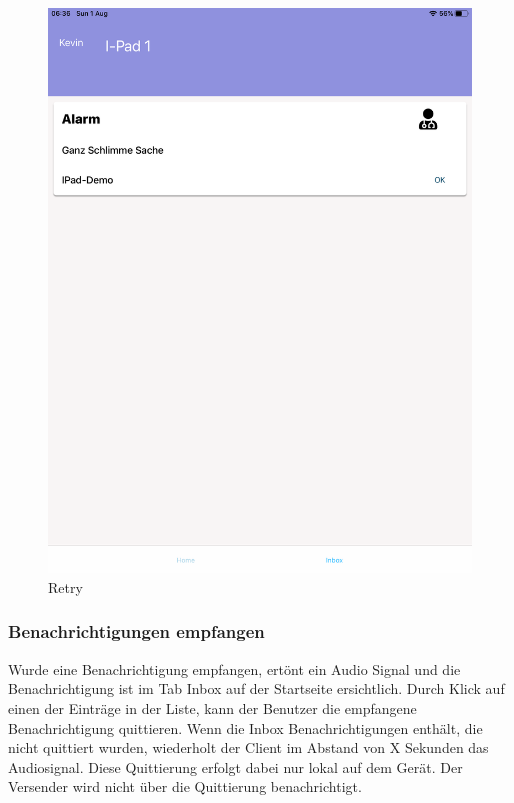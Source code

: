 \begin{figure}[h]
\begin{minipage}[b]{0.4\textwidth}
        \includegraphics[width=\textwidth]{graphics/screenshots/mobileclient/screenshots-inbox}
        \caption{Retry}
    \end{minipage}
    \label{fig:MobileClient-Screens2}
\end{figure}

\clearpage

\subsubsection*{Benachrichtigungen empfangen}

Wurde eine Benachrichtigung empfangen, ertönt ein Audio Signal und die Benachrichtigung ist im Tab Inbox auf der Startseite ersichtlich.
Durch Klick auf einen der Einträge in der Liste, kann der Benutzer die empfangene Benachrichtigung quittieren.
Wenn die Inbox Benachrichtigungen enthält, die nicht quittiert wurden, wiederholt der Client im Abstand von X Sekunden das Audiosignal.
Diese Quittierung erfolgt dabei nur lokal auf dem Gerät.
Der Versender wird nicht über die Quittierung benachrichtigt.

